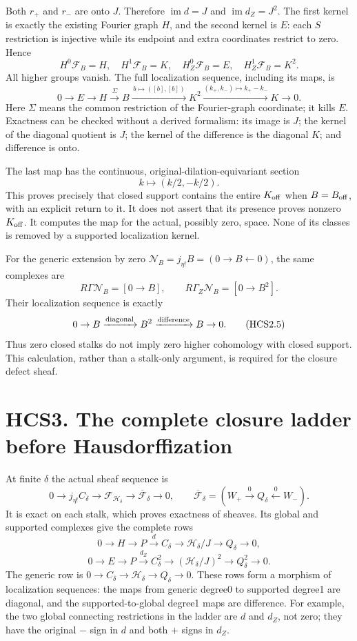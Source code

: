 Both \(r_+\) and \(r_-\) are onto \(J\). Therefore
\(\operatorname{im}d=J\) and \(\operatorname{im}d_Z=J^2\). The first
kernel is exactly the existing Fourier graph \(H\), and the second
kernel is \(E\): each \(S\) restriction is injective while its endpoint
and extra coordinates restrict to zero. Hence \[
H^0\mathcal F_B=H,\quad H^1\mathcal F_B=K,\quad
H_Z^0\mathcal F_B=E,\quad H_Z^1\mathcal F_B=K^2.
\tag{HCS2.2}
\] All higher groups vanish. The full localization sequence, including
its maps, is \[
\boxed{
0\to E\to H\xrightarrow{\ \Sigma\ }B
\xrightarrow{\,b\mapsto([b],[b])\,}K^2
\xrightarrow{(k_+,k_-)\mapsto k_+-k_-}K\to0.}
\tag{HCS2.3}
\] Here \(\Sigma\) means the common restriction of the Fourier-graph
coordinate; it kills \(E\). Exactness can be checked without a derived
formalism: its image is \(J\); the kernel of the diagonal quotient is
\(J\); the kernel of the difference is the diagonal \(K\); and
difference is onto.

The last map has the continuous, original-dilation-equivariant section
\[
k\longmapsto(k/2,-k/2).
\tag{HCS2.4}
\] This proves precisely that closed support contains the entire
\(K_{\rm off}\) when \(B=B_{\rm off}\), with an explicit return to it.
It does not assert that its presence proves nonzero \(K_{\rm off}\). It
computes the map for the actual, possibly zero, space. None of its
classes is removed by a supported localization kernel.

For the generic extension by zero
\(\mathcal N_B=j_{\eta!}B=(0\to B\leftarrow0)\), the same complexes are
\[
R\Gamma\mathcal N_B=[0\to B],\qquad
R\Gamma_Z\mathcal N_B=[0\to B^2].
\] Their localization sequence is exactly \[
0\to B\xrightarrow{\rm diagonal}B^2
\xrightarrow{\rm difference}B\to0.
\tag{HCS2.5}
\] Thus zero closed stalks do not imply zero higher cohomology with
closed support. This calculation, rather than a stalk-only argument, is
required for the closure defect sheaf.

\section{HCS3. The complete closure ladder before
Hausdorffization}\label{hcs3.-the-complete-closure-ladder-before-hausdorffization}

At finite \(\delta\) the actual sheaf sequence is \[
0\to j_{\eta!}C_\delta\to\mathcal F_{\mathcal H_\delta}
\to\overline{\mathcal F}_\delta\to0,\qquad
\overline{\mathcal F}_\delta
=(W_+\xrightarrow0Q_\delta\xleftarrow0W_-).
\tag{HCS3.1}
\] It is exact on each stalk, which proves exactness of sheaves. Its
global and supported complexes give the complete rows \[
0\to H\to P\xrightarrow d C_\delta
\to\mathcal H_\delta/J\to Q_\delta\to0,
\tag{HCS3.2}
\] \[
0\to E\to P\xrightarrow{d_Z}C_\delta^2
\to(\mathcal H_\delta/J)^2\to Q_\delta^2\to0.
\tag{HCS3.3}
\] The generic row is
\(0\to C_\delta\to\mathcal H_\delta\to Q_\delta\to0\). These rows form a
morphism of localization sequences: the maps from generic degree0 to
supported degree1 are diagonal, and the supported-to-global degree1 maps
are difference. For example, the two global connecting restrictions in
the ladder are \(d\) and \(d_Z\), not zero; they have the original \(-\)
sign in \(d\) and both \(+\) signs in \(d_Z\).

